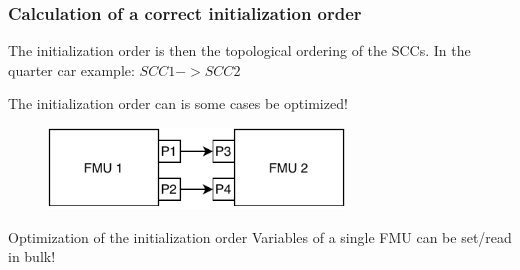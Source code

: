 \documentclass{beamer}
\begin{document}
\begin{frame}
\frametitle{Calculation of a correct initialization order}
The initialization order is then the topological ordering of the SCCs.
In the quarter car example: $SCC1 -> SCC2$

The initialization order can is some cases be optimized!

\begin{figure}
    \centering
    \includegraphics[width=0.7\textwidth]{images/optimizablescenario.pdf}
\end{figure}

\begin{exampleblock}{Optimization of the initialization order}
Variables of a single FMU can be set/read in bulk!
\end{exampleblock}
\end{frame}
\end{document}
